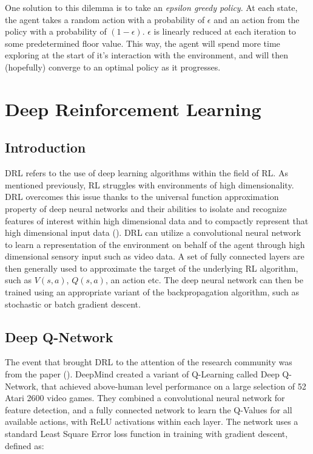 One solution to this dilemma is to take an \textit{epsilon greedy policy}. At each state, the agent
takes a random action with a probability of $\epsilon$ and an action from the policy with a
probability of $(1-\epsilon)$. $\epsilon$ is linearly reduced at each iteration to some
predetermined floor value. This way, the agent will spend more time exploring at the start of it's
interaction with the environment, and will then (hopefully) converge to an optimal policy as it progresses.

\section{Deep Reinforcement Learning}
\subsection{Introduction}
DRL refers to the use of deep learning algorithms within the field of RL. As mentioned previously, RL struggles with environments of high dimensionality. DRL overcomes this issue thanks to the universal function approximation property of deep neural networks and their abilities to isolate and recognize features of interest within high dimensional data and to compactly represent that high dimensional input data (\cite{survey-drl}). DRL can utilize a convolutional neural network to learn a representation of the environment on behalf of the agent through high dimensional sensory input such as video data. A set of fully connected layers are then generally used to approximate the target of the underlying RL algorithm, such as $V(s, a)$, $Q(s, a)$, an action etc. The deep neural network can then be trained using an appropriate variant of the backpropagation algorithm, such as stochastic or batch gradient descent. \paragraph{}

\subsection{Deep Q-Network}
The event that brought DRL to the attention of the research community was from the paper (\cite{deepmind1}). DeepMind created a variant of Q-Learning called Deep Q-Network, that achieved above-human level performance on a large selection of 52 Atari 2600 video games. They combined a convolutional neural network for feature detection, and a fully connected network to learn the Q-Values for all available actions, with ReLU activations within each layer. The network uses a standard Least Square Error loss function in training with gradient descent, defined as:

